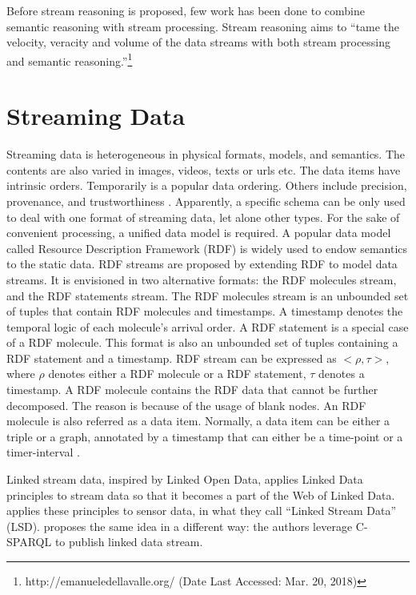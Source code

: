 Before stream reasoning \cite{della2009s} is proposed, few work has been done to combine semantic reasoning with stream processing. 
Stream reasoning aims to ``tame the velocity, veracity and volume of the data streams with both stream processing and semantic reasoning.''\footnote{http://emanueledellavalle.org/ (Date Last Accessed: Mar. 20, 2018)}
%
\section{Streaming Data}
Streaming data is heterogeneous in physical formats, models, and semantics.
The contents are also varied in images, videos, texts or urls etc.
The data items have intrinsic orders.
Temporarily is a popular data ordering. 
Others include precision, provenance, and trustworthiness \cite{della2013order}.
Apparently, a specific schema can be only used to deal with one format of streaming data, let alone other types. 
For the sake of convenient processing, a unified data model is required.
A popular data model called Resource Description Framework (RDF) is widely used to endow semantics to the static data.
RDF streams \cite{della2009first} are proposed by extending RDF to model data streams. 
It is envisioned in two alternative formats: the RDF molecules stream, and the RDF statements stream.
The RDF molecules stream is an unbounded set of tuples that contain RDF molecules \cite{ding2005tracking} and timestamps.
A timestamp denotes the temporal logic of each molecule's arrival order.
A RDF statement is a special case of a RDF molecule.
This format is also an unbounded set of tuples containing a RDF statement and a timestamp. 
RDF stream can be expressed as $<\rho , \tau>$, where $\rho$ denotes either a RDF molecule or a RDF statement, $\tau$ denotes a timestamp.
A RDF molecule contains the RDF data that cannot be further decomposed. 
The reason is because of the usage of blank nodes.
An RDF molecule is also referred as a data item. 
Normally, a data item can be either a triple or a graph, annotated by a timestamp that can either be a time-point or a timer-interval \cite{srtutorial}. 

Linked stream data, inspired by Linked Open Data, applies Linked Data principles \cite{bizer2008linked} to stream data so that it becomes a part of the Web of Linked Data.
\cite{sequeda2009linked} applies these principles to sensor data, in what they call ``Linked Stream Data'' (LSD). 
\cite{barbieri2010proposal} proposes the same idea in a different way: 
the authors leverage C-SPARQL \cite{barbieri2009c} to publish linked data stream.

